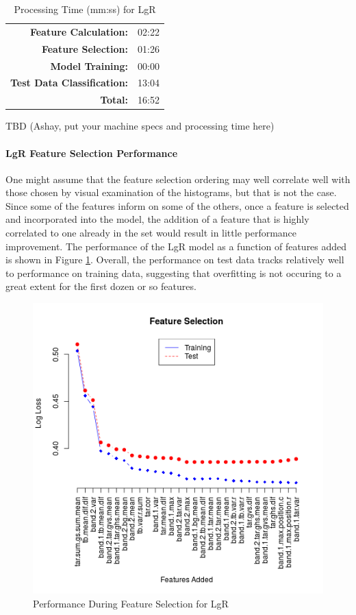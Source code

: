 \documentclass[fleqn,10pt]{SelfArx} %
\begin{document}
\begin{table}[H]
	\centering
	\caption{Processing Time (mm:ss) for LgR}\label{proc-time}
	\begin{tabular}{r l}
		\toprule
		\textbf{Feature Calculation:} 		& 02:22 \\
		\textbf{Feature Selection:}			& 01:26 \\
		\textbf{Model Training:}			& 00:00  \\
		\textbf{Test Data Classification:}	& 13:04 \\
		\textbf{Total:}						& 16:52
	\end{tabular}
\end{table}

TBD (Ashay, put your machine specs and processing time here)



\paragraph{LgR Feature Selection Performance}
One might assume that the feature selection ordering may well correlate well with those chosen by visual examination of the histograms, but that is not the case.  Since some of the features inform on some of the others, once a feature is selected and incorporated into the model, the addition of a feature that is highly correlated to one already in the set would result in little performance improvement.  The performance of the LgR model as a function of features added is shown in Figure \ref{feat_selection}.  Overall, the performance on test data tracks relatively well to performance on training data, suggesting that overfitting is not occuring to a great extent for the first dozen or so features.

\begin{figure}
	\includegraphics[width=.9\linewidth]{iceberg/feat_sel.png}
	\caption{Performance During Feature Selection for LgR}\label{feat_selection}
\end{figure}
\end{document}
